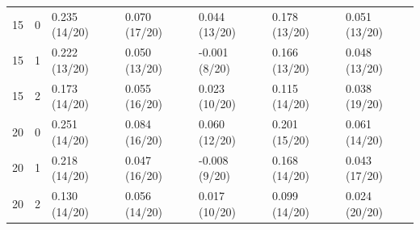 {\begin{longtable}{@{}p{9mm}p{11mm}p{29mm}p{29mm}p{29mm}p{29mm}p{29mm}@{}}
15 & 0 & 0.235 (14/20)\newline [-0.374, 1.027] & 0.070 (17/20)\newline [-0.163, 0.385] & 0.044 (13/20)\newline [-0.394, 0.267] & 0.178 (13/20)\newline [-0.492, 1.037] & 0.051 (13/20)\newline [-0.102, 0.255]\\
15 & 1 & 0.222 (13/20)\newline [-0.452, 1.050] & 0.050 (13/20)\newline [-0.149, 0.413] & -0.001 (8/20)\newline [-0.580, 0.295] & 0.166 (13/20)\newline [-0.525, 1.064] & 0.048 (13/20)\newline [-0.041, 0.238]\\
15 & 2 & 0.173 (14/20)\newline [-0.395, 0.640] & 0.055 (16/20)\newline [-0.063, 0.239] & 0.023 (10/20)\newline [-0.389, 0.190] & 0.115 (14/20)\newline [-0.409, 0.565] & 0.038 (19/20)\newline [-0.006, 0.261]\\
20 & 0 & 0.251 (14/20)\newline [-0.430, 1.123] & 0.084 (16/20)\newline [-0.143, 0.542] & 0.060 (12/20)\newline [-0.445, 0.433] & 0.201 (15/20)\newline [-0.521, 1.143] & 0.061 (14/20)\newline [-0.040, 0.283]\\
20 & 1 & 0.218 (14/20)\newline [-0.562, 0.758] & 0.047 (16/20)\newline [-0.097, 0.269] & -0.008 (9/20)\newline [-0.581, 0.247] & 0.168 (14/20)\newline [-0.553, 0.699] & 0.043 (17/20)\newline [-0.090, 0.259]\\
20 & 2 & 0.130 (14/20)\newline [-0.414, 0.775] & 0.056 (14/20)\newline [-0.122, 0.252] & 0.017 (10/20)\newline [-0.412, 0.180] & 0.099 (14/20)\newline [-0.431, 0.672] & 0.024 (20/20)\newline [0.004, 0.214]\\
\end{longtable}
}
